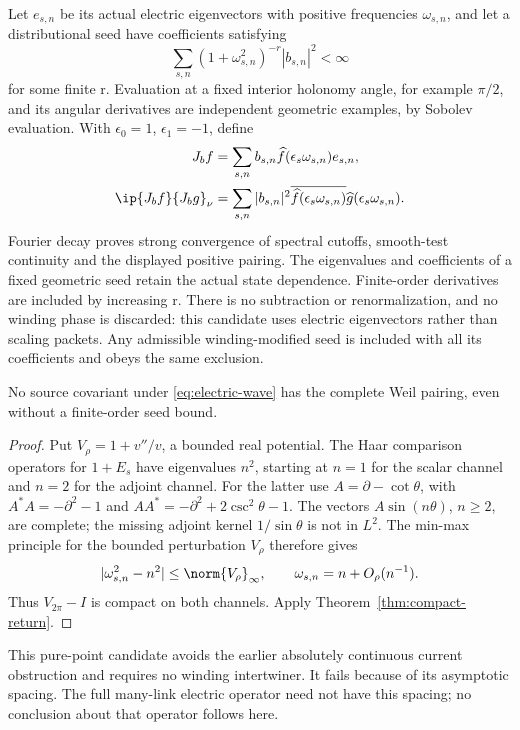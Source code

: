 Let $e_{s,n}$ be its actual electric eigenvectors with positive
frequencies $\omega_{s,n}$, and let a distributional seed have
coefficients satisfying
\begin{equation}
\sum_{s,n}(1+\omega_{s,n}^2)^{-r}|b_{s,n}|^2<\infty
\end{equation}
for some finite r. Evaluation at a fixed interior holonomy
angle, for example $\pi/2$, and its angular derivatives are
independent geometric examples, by Sobolev evaluation.
With $\epsilon_0=1$, $\epsilon_1=-1$, define
\begin{align}
J_bf&=\sum_{s,n}b_{s,n}\widehat f(\epsilon_s\omega_{s,n})e_{s,n},\\
\ip{J_bf}{J_bg}_\nu
&=\sum_{s,n}|b_{s,n}|^2
\overline{\widehat f(\epsilon_s\omega_{s,n})}
\widehat g(\epsilon_s\omega_{s,n}).\label{eq:electric-wave-pair}
\end{align}
Fourier decay proves strong convergence of spectral cutoffs,
smooth-test continuity and the displayed positive pairing.
The eigenvalues and coefficients of a fixed geometric seed
retain the actual state dependence. Finite-order derivatives
are included by increasing r. There is no subtraction or
renormalization, and no winding phase is discarded: this
candidate uses electric eigenvectors rather than scaling
packets. Any admissible winding-modified seed is included
with all its coefficients and obeys the same exclusion.

\begin{proposition}
No source covariant under \eqref{eq:electric-wave} has the
complete Weil pairing, even without a finite-order seed bound.
\end{proposition}
\begin{proof}
Put $V_\rho=1+v''/v$, a bounded real potential.
The Haar comparison operators for $1+E_s$ have eigenvalues
$n^2$, starting at $n=1$ for the scalar channel and $n=2$
for the adjoint channel. For the latter use
$A=\partial-\cot\theta$, with
$A^*A=-\partial^2-1$ and
$AA^*=-\partial^2+2\csc^2\theta-1$.
The vectors $A\sin(n\theta)$, $n\ge2$, are complete;
the missing adjoint kernel $1/\sin\theta$ is not in $L^2$.
The min-max principle for the bounded perturbation $V_\rho$
therefore gives
\begin{equation}
|\omega_{s,n}^2-n^2|\le\norm{V_\rho}_\infty,\qquad
\omega_{s,n}=n+O_\rho(n^{-1}).
\end{equation}
Thus $V_{2\pi}-I$ is compact on both channels. Apply
Theorem~\ref{thm:compact-return}.
\end{proof}
This pure-point candidate avoids the earlier absolutely
continuous current obstruction and requires no winding
intertwiner. It fails because of its asymptotic spacing.
The full many-link electric operator need not have this
spacing; no conclusion about that operator follows here.

